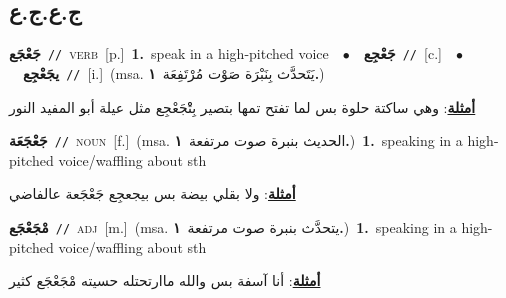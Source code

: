 \documentclass[10pt,a4paper,twoside]{article} %
\begin{document}
\begin{multicols}{2}
\vspace{-3mm}
\subsection*{\color{blue}\foreignlanguage{arabic}{ج.ع.ج.ع}\color{blue}{}} 

{\setlength\topsep{0pt}\textbf{\foreignlanguage{arabic}{جَعْجَع}}\ {\color{gray}\texttt{//}\color{black}}\ \textsc{verb}\ [p.]\ \textbf{1.}~speak in a high-pitched voice\ \ $\bullet$\ \ \setlength\topsep{0pt}\textbf{\foreignlanguage{arabic}{جَعْجِع}}\ {\color{gray}\texttt{//}\color{black}}\ [c.]\ \ $\bullet$\ \ \setlength\topsep{0pt}\textbf{\foreignlanguage{arabic}{يجَعْجِع}}\ {\color{gray}\texttt{//}\color{black}}\ [i.]\ \color{gray}(msa. \foreignlanguage{arabic}{يَتَحدَّث بِنَبْرَة صَوْت مُرْتَفِعَة}~\foreignlanguage{arabic}{\textbf{١.}})\color{black}\  \begin{flushright}\color{gray}\foreignlanguage{arabic}{\textbf{\underline{\foreignlanguage{arabic}{أمثلة}}}: وهي ساكتة حلوة بس لما تفتح تمها بتصير بِتْْجَعْجِع مثل عيلة أبو المفيد النور}\end{flushright}\color{black}} \vspace{2mm}

{\setlength\topsep{0pt}\textbf{\foreignlanguage{arabic}{جَعْجَعَة}}\ {\color{gray}\texttt{//}\color{black}}\ \textsc{noun}\ [f.]\ \color{gray}(msa. \foreignlanguage{arabic}{الحديث بنبرة صوت مرتفعة}~\foreignlanguage{arabic}{\textbf{١.}})\color{black}\ \textbf{1.}~speaking in a high-pitched voice/waffling about sth\  \begin{flushright}\color{gray}\foreignlanguage{arabic}{\textbf{\underline{\foreignlanguage{arabic}{أمثلة}}}: ولا بقلي بيضة بس بيجعجِع جَعْجَعة عالفاضي}\end{flushright}\color{black}} \vspace{2mm}

{\setlength\topsep{0pt}\textbf{\foreignlanguage{arabic}{مْجَعْجَع}}\ {\color{gray}\texttt{//}\color{black}}\ \textsc{adj}\ [m.]\ \color{gray}(msa. \foreignlanguage{arabic}{يتحدَّث بنبرة صوت مرتفعة}~\foreignlanguage{arabic}{\textbf{١.}})\color{black}\ \textbf{1.}~speaking in a high-pitched voice/waffling about sth\  \begin{flushright}\color{gray}\foreignlanguage{arabic}{\textbf{\underline{\foreignlanguage{arabic}{أمثلة}}}: أنا آسفة بس والله ماارتحتله حسيته مْجَعْجَع كثير}\end{flushright}\color{black}} \vspace{2mm}


\end{multicols}
\end{document}
